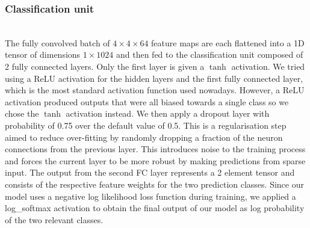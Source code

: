 \documentclass{l4proj}
\begin{document}
\subsubsection{Classification unit}\hfill\\
The fully convolved batch of \(4 \times 4 \times 64\) feature maps are each flattened into a 1D tensor of dimensions \(1 \times 1024\) and then fed to the classification unit composed of 2 fully connected layers. Only the first layer is given a \(\tanh\) activation. We tried using a ReLU activation for the hidden layers and the first fully connected layer, which is the most standard activation function used nowadays. However, a ReLU activation produced outputs that were all biased towards a single class so we chose the \(\tanh\) activation instead. We then apply a dropout layer with  probability of 0.75 over the default value of 0.5. This is a regularisation step aimed to reduce over-fitting by randomly dropping a fraction of the neuron connections from the previous layer. This introduces noise to the training process and forces the current layer to be more robust by making predictions from sparse input. The  output from the second FC layer represents a 2 element tensor and consists of the respective feature weights for the two prediction classes. Since our model uses a negative log likelihood loss function during training, we applied a log\_softmax activation to obtain the final output of our model as log probability of the two relevant classes. 
\end{document}

